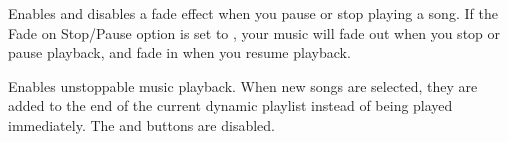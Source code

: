 \begin{description}
{    
    
    
  \item[Fade On Stop/Pause: ]Enables and disables a fade effect when you
    pause or stop playing a song. If the Fade on Stop/Pause option is
    set to , your music will fade out when you stop or pause 
    playback, and fade in when you resume playback.
    
  \item[Party Mode: ]Enables unstoppable music playback.  When new songs are
    selected, they are added to the end of the current dynamic playlist
    instead of being played immediately.
    The  and  buttons are disabled.
    
}
\end{description}
